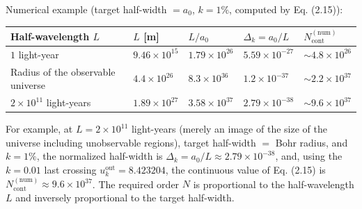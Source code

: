 \documentclass[
]{ltjsarticle}
\newcounter{none} %
\begin{document}
Numerical example (target half-width \(=a_0\), \(k=1\%\), computed by
Eq. (2.15)):

{\def\LTcaptype{none} %
\begin{longtable}[]{@{}
  >{\raggedright\arraybackslash}p{}
  >{\raggedleft\arraybackslash}p{}
  >{\raggedleft\arraybackslash}p{}
  >{\raggedleft\arraybackslash}p{}
  >{\raggedleft\arraybackslash}p{}@{}}
\toprule\noalign{}
\begin{minipage}[b]{\linewidth}\raggedright
Half-wavelength \(L\)
\end{minipage} & \begin{minipage}[b]{\linewidth}\raggedleft
\(L\) {[}m{]}
\end{minipage} & \begin{minipage}[b]{\linewidth}\raggedleft
\(L/a_0\)
\end{minipage} & \begin{minipage}[b]{\linewidth}\raggedleft
\(\Delta_k=a_0/L\)
\end{minipage} & \begin{minipage}[b]{\linewidth}\raggedleft
\(N_{\mathrm{cont}}^{(\mathrm{num})}\)
\end{minipage} \\
\midrule\noalign{}
\endhead
\bottomrule\noalign{}
\endlastfoot
\(1\) light-year & \(9.46\times10^{15}\) & \(1.79\times10^{26}\) &
\(5.59\times10^{-27}\) & \(\sim 4.8\times10^{26}\) \\
Radius of the observable universe & \(4.4\times10^{26}\) &
\(8.3\times10^{36}\) & \(1.2\times10^{-37}\) &
\(\sim 2.2\times10^{37}\) \\
\(2\times10^{11}\) light-years & \(1.89\times10^{27}\) &
\(3.58\times10^{37}\) & \(2.79\times10^{-38}\) &
\(\sim 9.6\times10^{37}\) \\
\end{longtable}
}

For example, at \(L=2\times10^{11}\) light-years (merely an image of the
size of the universe including unobservable regions), target half-width
\(=\) Bohr radius, and \(k=1\%\), the normalized half-width is
\(\Delta_k=a_0/L\approx2.79\times10^{-38}\), and, using the \(k=0.01\)
last crossing \(u_k^{\mathrm{out}}=8.423204\), the continuous value of
Eq. (2.15) is
\(N_{\mathrm{cont}}^{(\mathrm{num})}\approx9.6\times10^{37}\). The
required order \(N\) is proportional to the half-wavelength \(L\) and
inversely proportional to the target half-width.
\end{document}
